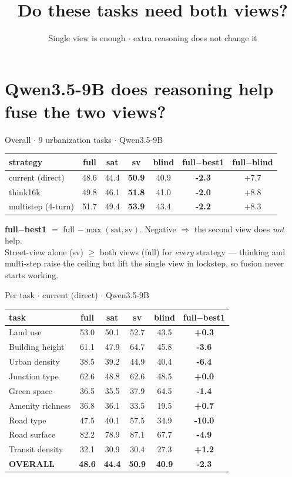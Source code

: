 \documentclass[aspectratio=169]{beamer}
\title{Do these tasks need both views?}
\subtitle{Single view is enough \textbf{$\cdot$} extra reasoning does not change it}
\date{}\author{}
\begin{document}
\maketitle
\section{Qwen3.5-9B \textemdash{} does reasoning help fuse the two views?}
\begin{frame}{Overall \textbf{$\cdot$} 9 urbanization tasks \textbf{$\cdot$} Qwen3.5-9B}
\centering
\begin{tabular}{lcccc>{\bfseries}cc}
\toprule
strategy & full & sat & sv & blind & full$-$best1 & full$-$blind \\
\midrule
current (direct) & 48.6 & 44.4 & \textbf{50.9} & 40.9 & \textcolor{bad}{-2.3} & +7.7 \\
think16k & 49.8 & 46.1 & \textbf{51.8} & 41.0 & \textcolor{bad}{-2.0} & +8.8 \\
multistep (4-turn) & 51.7 & 49.4 & \textbf{53.9} & 43.4 & \textcolor{bad}{-2.2} & +8.3 \\
\bottomrule
\end{tabular}
\vfill\footnotesize
\textbf{full$-$best1} $=$ full $-\max(\text{sat},\text{sv})$. Negative $\Rightarrow$ the second view does \emph{not} help.\\
Street-view alone (sv) $\geq$ both views (full) for \emph{every} strategy --- thinking and multi-step
raise the ceiling but lift the single view in lockstep, so fusion never starts working.
\end{frame}
\begin{frame}{Per task \textbf{$\cdot$} current (direct) \textbf{$\cdot$} Qwen3.5-9B}
\centering\scriptsize
\begin{tabular}{lcccc>{\bfseries}c}
\toprule
task & full & sat & sv & blind & full$-$best1 \\
\midrule
Land use & 53.0 & 50.1 & 52.7 & 43.5 & +0.3 \\
Building height & 61.1 & 47.9 & 64.7 & 45.8 & \textcolor{bad}{-3.6} \\
Urban density & 38.5 & 39.2 & 44.9 & 40.4 & \textcolor{bad}{-6.4} \\
Junction type & 62.6 & 48.8 & 62.6 & 48.5 & +0.0 \\
Green space & 36.5 & 35.5 & 37.9 & 64.5 & \textcolor{bad}{-1.4} \\
Amenity richness & 36.8 & 36.1 & 33.5 & 19.5 & +0.7 \\
Road type & 47.5 & 40.1 & 57.5 & 34.9 & \textcolor{bad}{-10.0} \\
Road surface & 82.2 & 78.9 & 87.1 & 67.7 & \textcolor{bad}{-4.9} \\
Transit density & 32.1 & 30.9 & 30.4 & 27.3 & +1.2 \\
\midrule
\textbf{OVERALL} & \textbf{48.6} & \textbf{44.4} & \textbf{50.9} & \textbf{40.9} & \textbf{\textcolor{bad}{-2.3}} \\
\bottomrule
\end{tabular}
\end{frame}
\end{document}
